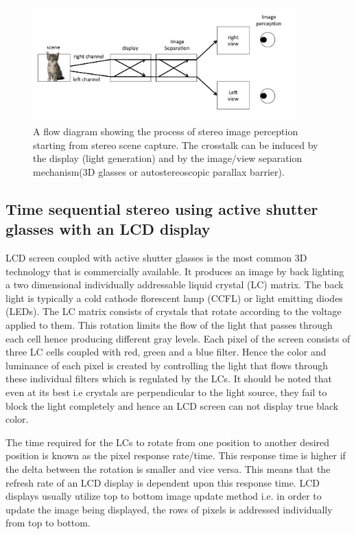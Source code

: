 \begin{figure}
\centering
    \includegraphics[width=0.9\textwidth]{./Template_Figures/ct_flow}
    \caption{A flow diagram showing the process of stereo image perception starting from stereo scene capture. The crosstalk can be induced by the display (light generation) and by the image/view separation mechanism(3D glasses or autostereoscopic parallax barrier).\label{fig:ctflow}}
\end{figure}

\subsection{Time sequential stereo using active shutter glasses with an LCD display}
LCD screen coupled with active shutter glasses is the most common 3D technology that is commercially available. It produces an image by back lighting a two dimensional individually addressable liquid crystal (LC) matrix. The back light is typically a cold cathode florescent lamp (CCFL) or light emitting diodes (LEDs). The LC matrix consists of crystals that rotate according to the voltage applied to them. This rotation limits the flow of the light that passes through each cell hence producing different gray levels. Each pixel of the screen consists of three LC cells coupled with red, green and a blue filter. Hence the color and luminance of each pixel is created by controlling the light that flows through these individual filters which is regulated by the LCs. It should be noted that even at its best i.e crystals are perpendicular to the light source, they fail to block the light completely and hence an LCD screen can not display true black color.

The time required for the LCs to rotate from one position to another desired position is known as the pixel response rate/time. This response time is higher if the delta between the rotation is smaller and vice versa\cite{woods2012crosstalk}. This means that the refresh rate of an LCD display is dependent upon this response time. LCD displays usually utilize top to bottom image update method i.e. in order to update the image being displayed, the rows of pixels is addressed individually from top to bottom.

